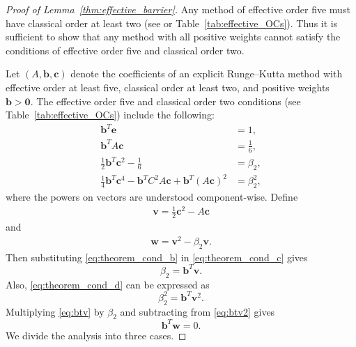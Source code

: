 \begin{proof}[Proof of Lemma~\ref{thm:effective_barrier}]
	Any method of effective order five must have classical order at least two
	(see \cite{Butcher2008_book} or Table~\ref{tab:effective_OCs}).
    Thus it is sufficient to show that any method with all positive weights
    cannot satisfy the conditions of effective order five and classical order two.

    Let $(A,\bm{b},\bm{c})$ denote the coefficients of an explicit Runge--Kutta method with
    effective order at least five, classical order at least two, and positive 
    weights $\bm{b} > \bm{0}$.
    The effective order five and classical order two conditions
    (see Table~\ref{tab:effective_OCs}) include the following:
    \begin{subequations}\label{eq:theorem_cond}
    		\begin{align}
    			\bm{b}^T\bm{e} & = 1, \label{eq:theorem_cond_a} \\
             	\bm{b}^TA\bm{c} &= \frac{1}{6}, \label{eq:theorem_cond_b} \\
            	\frac{1}{2}\bm{b}^T\bm{c}^2 - \frac{1}{6} &= \beta_2, \label{eq:theorem_cond_c} \\
            	\frac{1}{4}\bm{b}^T\bm{c}^4 - \bm{b}^TC^2A\bm{c} + \bm{b}^T(A\bm{c})^2 &= \beta_2^2, \label{eq:theorem_cond_d}
        	\end{align}
	\end{subequations}
	where the powers on vectors are understood component-wise. 
	Define
	\begin{align*} 
		\bm{v} = \frac{1}{2}\bm{c}^2 - A\bm{c}
	\end{align*}
	and
	\begin{align}\label{eq:def_w}
		\bm{w} = \bm{v}^{2} - \beta_{2}\bm{v}.
	\end{align}
	Then substituting \eqref{eq:theorem_cond_b} in \eqref{eq:theorem_cond_c} gives
	\begin{equation}\label{eq:btv}
		\beta_2 = \bm{b}^T\bm{v}.
	\end{equation}
	Also, \eqref{eq:theorem_cond_d} can be expressed as
	\begin{equation}\label{eq:btv2}
		\beta_2^2 = \bm{b}^T\bm{v}^2.
	\end{equation}
        Multiplying \eqref{eq:btv} by $\beta_2$ and subtracting
        from \eqref{eq:btv2} gives
	\begin{equation}\label{eq:btw}
		\bm{b}^T\bm{w} = 0.
	\end{equation}
        We divide the analysis into three cases.

\end{proof}
